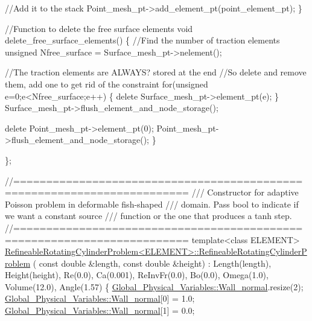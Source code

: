 \begin{DoxyCodeInclude}
    \textcolor{comment}{//Add it to the stack}
    Point\_mesh\_pt->add\_element\_pt(point\_element\_pt);
  \}

 \textcolor{comment}{//Function to delete the free surface elements}
 \textcolor{keywordtype}{void} delete\_free\_surface\_elements()
  \{
   \textcolor{comment}{//Find the number of traction elements}
   \textcolor{keywordtype}{unsigned} Nfree\_surface = Surface\_mesh\_pt->nelement();
   
   \textcolor{comment}{//The traction elements are ALWAYS? stored at the end}
   \textcolor{comment}{//So delete and remove them, add one to get rid of the constraint}
   \textcolor{keywordflow}{for}(\textcolor{keywordtype}{unsigned} e=0;e<Nfree\_surface;e++)
    \{
     \textcolor{keyword}{delete} Surface\_mesh\_pt->element\_pt(e);
    \}
   Surface\_mesh\_pt->flush\_element\_and\_node\_storage();

   \textcolor{keyword}{delete} Point\_mesh\_pt->element\_pt(0);
   Point\_mesh\_pt->flush\_element\_and\_node\_storage();
  \}


\};


\textcolor{comment}{//========================================================================}\textcolor{comment}{}
\textcolor{comment}{/// Constructor for adaptive Poisson problem in deformable fish-shaped}
\textcolor{comment}{/// domain. Pass bool to indicate if we want a constant source}
\textcolor{comment}{/// function or the one that produces a tanh step.}
\textcolor{comment}{}\textcolor{comment}{//========================================================================}
\textcolor{keyword}{template}<\textcolor{keyword}{class} ELEMENT>
\hyperlink{classRefineableRotatingCylinderProblem_aa597c4240ce9affbd7540998167c8f21}{RefineableRotatingCylinderProblem<ELEMENT>::RefineableRotatingCylinderProblem}
      (
 \textcolor{keyword}{const} \textcolor{keywordtype}{double} &length, \textcolor{keyword}{const} \textcolor{keywordtype}{double} &height) : Length(length), Height(height),
                                               Re(0.0), Ca(0.001), 
                                               ReInvFr(0.0),
                                               Bo(0.0), Omega(1.0), 
                                               Volume(12.0),
                                               Angle(1.57)
\{ 
 \hyperlink{namespaceGlobal__Physical__Variables_a5feb3df21fc4a0adefadecb8a8ed98d7}{Global\_Physical\_Variables::Wall\_normal}.resize(2);
 \hyperlink{namespaceGlobal__Physical__Variables_a5feb3df21fc4a0adefadecb8a8ed98d7}{Global\_Physical\_Variables::Wall\_normal}[0] = 1.0; 
 \hyperlink{namespaceGlobal__Physical__Variables_a5feb3df21fc4a0adefadecb8a8ed98d7}{Global\_Physical\_Variables::Wall\_normal}[1] = 0.0;


\end{DoxyCodeInclude}
